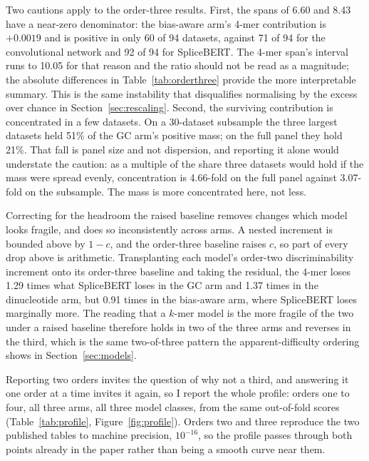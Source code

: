 Two cautions apply to the order-three results. First,
the spans of 6.60 and 8.43 have a near-zero denominator: the bias-aware arm's 4-mer
contribution is $+0.0019$ and is positive in only 60 of 94 datasets, against 71 of 94 for the
convolutional network and 92 of 94 for SpliceBERT. The 4-mer span's interval runs to 10.05 for
that reason and the ratio should not be read as a magnitude; the absolute differences in
Table~\ref{tab:orderthree} provide the more interpretable summary. This is the same instability that disqualifies
normalising by the excess over chance in Section~\ref{sec:rescaling}. Second, the surviving
contribution is concentrated in a few datasets. On a 30-dataset subsample the three largest
datasets held 51\% of the GC arm's positive mass; on the full panel they hold 21\%. That fall
is panel size and not dispersion, and reporting it alone would understate the caution: as a
multiple of the share three datasets would hold if the mass were spread evenly, concentration
is 4.66-fold on the full panel against 3.07-fold on the subsample. The mass is more
concentrated here, not less.

Correcting for the headroom the raised baseline removes changes which model looks fragile, and
does so inconsistently across arms. A nested increment is bounded above by $1-c$, and the
order-three baseline raises $c$, so part of every drop above is arithmetic. Transplanting each
model's order-two discriminability increment onto its order-three baseline and taking the
residual, the 4-mer loses 1.29 times what SpliceBERT loses in the GC arm and 1.37 times in the
dinucleotide arm, but 0.91 times in the bias-aware arm, where SpliceBERT loses marginally more.
The reading that a $k$-mer model is the more fragile of the two under a raised baseline
therefore holds in two of the three arms and reverses in the third, which is the same
two-of-three pattern the apparent-difficulty ordering shows in
Section~\ref{sec:models}.

Reporting two orders invites the question of why not a third, and answering it one order at a
time invites it again, so I report the whole profile: orders one to four, all three arms, all
three model classes, from the same out-of-fold scores (Table~\ref{tab:profile},
Figure~\ref{fig:profile}). Orders two and
three reproduce the two published tables to machine precision, $10^{-16}$, so the profile passes
through both points already in the paper rather than being a smooth curve near them.

